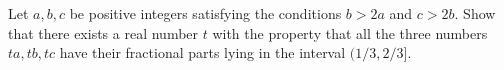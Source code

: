 Let $a, b, c$ be positive integers satisfying the conditions $b > 2a$ and $c > 2b$. Show that there exists a real number $t$ with the property that all the three numbers $ta, tb, tc$ have their fractional parts lying in the interval $(1/3, 2/3]$.
